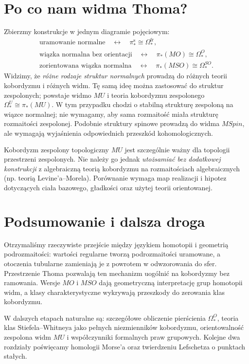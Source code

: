 \section{Po co nam widma Thoma?}
Zbierzmy konstrukcje w jednym diagramie pojęciowym:
\[
\begin{gathered}
\text{uramowanie normalne} \quad\longleftrightarrow\quad
\pi_*^{\mathrm s}\cong\Omega_*^{\mathrm{fr}},\\[3pt]
\text{wiązka normalna bez orientacji}\quad\longleftrightarrow\quad
\pi_*(MO)\cong\Omega_*^O,\\[3pt]
\text{zorientowana wiązka normalna}\quad\longleftrightarrow\quad
\pi_*(MSO)\cong\Omega_*^{SO}.
\end{gathered}
\]
Widzimy, że \emph{różne rodzaje struktur normalnych}
prowadzą do różnych teorii kobordyzmu i różnych widm.
Tę samą ideę można zastosować do struktur zespolonych;
powstaje widmo $MU$ i teoria kobordyzmu zespolonego
$\Omega_*^U\cong\pi_*(MU)$. W tym przypadku chodzi
o stabilną strukturę zespoloną na wiązce normalnej;
nie wymagamy, aby sama rozmaitość miała strukturę
rozmaitości zespolonej. Podobnie struktury spinowe
prowadzą do widma $MSpin$, ale wymagają wyjaśnienia
odpowiednich przeszkód kohomologicznych.

\begin{uwaga}
Kobordyzm zespolony topologiczny $MU$ jest szczególnie
ważny dla topologii przestrzeni zespolonych. Nie należy
go jednak \emph{utożsamiać bez dodatkowej konstrukcji}
z algebraiczną teorią kobordyzmu na rozmaitościach
algebraicznych (np. teorią Levine'a--Morela).
Porównanie wymaga map realizacji i hipotez dotyczących
ciała bazowego, gładkości oraz użytej teorii orientowanej.
\end{uwaga}

\section{Podsumowanie i dalsza droga}
Otrzymaliśmy rzeczywiste przejście między językiem
homotopii i geometrią podrozmaitości: wartości regularne
tworzą podrozmaitości uramowane, a otoczenia tubularne
zamieniają je z powrotem w odwzorowania do sfer.
Przestrzenie Thoma pozwalają ten mechanizm uogólnić
na kobordyzmy bez ramowania. Wersje $MO$ i $MSO$
dają geometryczną interpretację grup homotopii widm,
a klasy charakterystyczne wykrywają przeszkody do
zerowania klas kobordyzmu.

W dalszych etapach naturalne są: szczegółowe obliczenie
pierścienia $\Omega_*^O$, teoria klas Stiefela--Whitneya
jako pełnych niezmienników kobordyzmu, orientowalność
zespolona widm $MU$ i współczynniki formalnych praw
grupowych. Kolejne dwa rozdziały poświęcamy homologii Morse'a oraz
twierdzeniu Lefschetza o punktach stałych.


